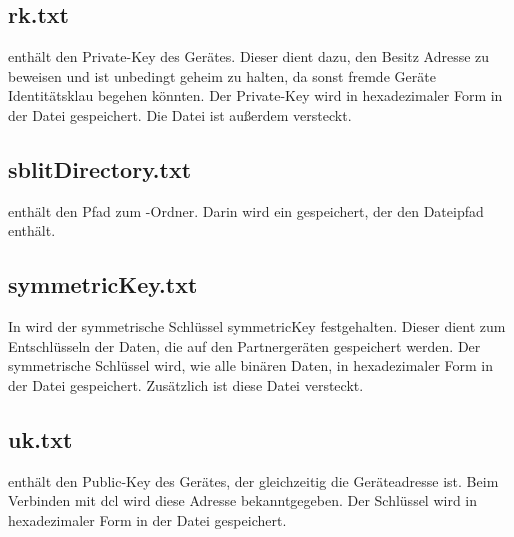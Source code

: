 \subsection{rk.txt} \label{rktxt}
 enthält den Private-Key des Gerätes. Dieser dient dazu, den Besitz Adresse zu beweisen und ist unbedingt geheim zu halten, da sonst fremde Geräte Identitätsklau begehen könnten. Der Private-Key wird in hexadezimaler Form in der Datei gespeichert. Die Datei ist außerdem versteckt.

\subsection{sblitDirectory.txt} \label{sblitDirectorytxt}
 enthält den Pfad zum \sblit-Ordner. Darin wird ein  gespeichert, der den Dateipfad enthält. 

\subsection{symmetricKey.txt} \label{symmetricKeytxt}
In  wird der symmetrische Schlüssel \gls{symmetricKey} festgehalten. Dieser dient zum Entschlüsseln der Daten, die auf den Partnergeräten gespeichert werden. Der symmetrische Schlüssel wird, wie alle binären Daten, in hexadezimaler Form in der Datei gespeichert. Zusätzlich ist diese Datei versteckt.

\subsection{uk.txt} \label{uktxt}
 enthält den Public-Key des Gerätes, der gleichzeitig die Geräteadresse ist. Beim Verbinden mit \gls{dcl} wird diese Adresse bekanntgegeben. Der Schlüssel wird in hexadezimaler Form in der Datei gespeichert.

